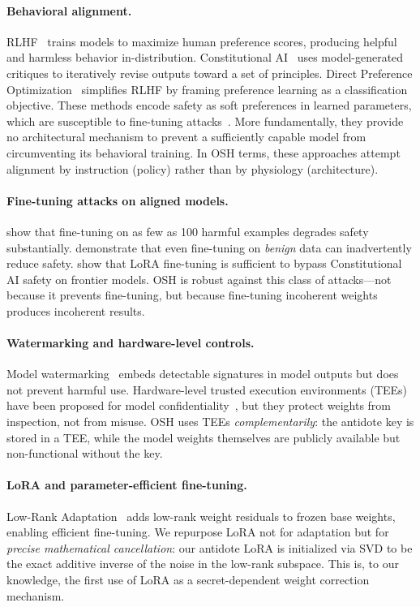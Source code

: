 \documentclass[10pt,letterpaper]{article}
\begin{document}
\paragraph{Behavioral alignment.}
RLHF~\citep{christiano2017deep, ouyang2022training, bai2022training} trains
models to maximize human preference scores, producing helpful and harmless
behavior in-distribution. Constitutional AI~\citep{bai2022constitutional} uses
model-generated critiques to iteratively revise outputs toward a set of
principles. Direct Preference Optimization~\citep{rafailov2023direct}
simplifies RLHF by framing preference learning as a classification objective.
These methods encode safety as soft preferences in learned parameters, which
are susceptible to fine-tuning attacks~\citep{yang2023shadow, qi2023fine,
lermen2023lora}. More fundamentally, they provide no architectural mechanism to
prevent a sufficiently capable model from circumventing its behavioral training.
In OSH terms, these approaches attempt alignment by instruction (policy) rather
than by physiology (architecture).

\paragraph{Fine-tuning attacks on aligned models.}
\citet{qi2023fine} show that fine-tuning on as few as 100 harmful examples
degrades safety substantially. \citet{yang2023shadow} demonstrate that even
fine-tuning on \emph{benign} data can inadvertently reduce safety.
\citet{lermen2023lora} show that LoRA fine-tuning is sufficient to bypass
Constitutional AI safety on frontier models. OSH is robust against this class
of attacks---not because it prevents fine-tuning, but because fine-tuning
incoherent weights produces incoherent results.

\paragraph{Watermarking and hardware-level controls.}
Model watermarking~\citep{kirchenbauer2023watermark} embeds detectable
signatures in model outputs but does not prevent harmful use. Hardware-level
trusted execution environments (TEEs) have been proposed for model
confidentiality~\citep{tee_ai}, but they protect weights from inspection, not
from misuse. OSH uses TEEs \emph{complementarily}: the antidote key is stored
in a TEE, while the model weights themselves are publicly available but
non-functional without the key.

\paragraph{LoRA and parameter-efficient fine-tuning.}
Low-Rank Adaptation~\citep{hu2021lora} adds low-rank weight residuals to frozen
base weights, enabling efficient fine-tuning. We repurpose LoRA not for
adaptation but for \emph{precise mathematical cancellation}: our antidote LoRA
is initialized via SVD to be the exact additive inverse of the noise in the
low-rank subspace. This is, to our knowledge, the first use of LoRA as a
secret-dependent weight correction mechanism.
\end{document}
